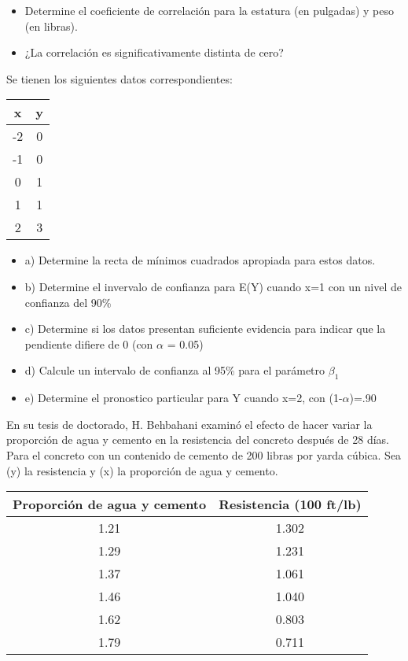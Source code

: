 \documentclass{../oxmathproblems}
\begin{document}
\begin{questions}
\begin{itemize}
  \item Determine el coeficiente de correlación para la estatura (en pulgadas) y peso (en libras). 
  \item ¿La correlación es significativamente distinta de cero?
\end{itemize}

\miquestion Se tienen los siguientes datos correspondientes:   

\begin{tabular}{|c|c|}
\hline
x & y \\ \hline
-2 & 0\\
-1 & 0\\
0 & 1\\ 
1& 1\\ 
2 & 3\\ 
\hline
\end{tabular}

\begin{itemize}
  \item a) Determine la recta de mínimos cuadrados apropiada para estos datos. 
  \item b) Determine el invervalo de confianza para E(Y) cuando x=1 con un nivel de confianza del 90\%
  \item c) Determine si los datos presentan suficiente evidencia para indicar que la pendiente difiere de 0 (con $\alpha$ = 0.05)
  \item d) Calcule un intervalo de confianza al 95\% para el parámetro  $\beta_1$
  \item e) Determine el pronostico particular para Y cuando x=2, con  (1-$\alpha$)=.90
\end{itemize}


\miquestion  En su tesis de doctorado, H. Behbahani examinó el efecto de hacer variar la proporción de agua y cemento en la resistencia del concreto después de 28 días. Para el concreto con un contenido de cemento de 200 libras por yarda cúbica. Sea (y) la resistencia y (x) la proporción de agua y cemento. 


\begin{tabular}{|c|c|}
\hline
Proporción de agua y cemento & Resistencia (100 ft/lb) \\ \hline
1.21 & 1.302\\
1.29 & 1.231\\
1.37 & 1.061\\ 
1.46 & 1.040\\ 
1.62 & 0.803\\ 
1.79 & 0.711\\ 
\hline
\end{tabular}


\end{questions}
\end{document}
